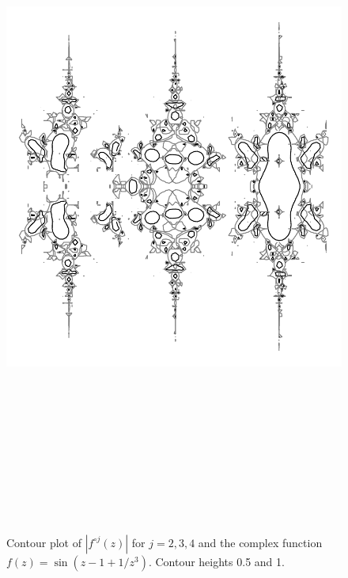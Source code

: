 \documentclass[12pt, a4paper]{amsart}
\begin{document}
\begin{figure}[!ht]
\includegraphics[width=160mm, height=230mm, angle=180]{indian_caterpillar.pdf}
\caption{
Contour plot of $|f^{\circ j}(z)|$ for $j = 2, 3, 4$ and the complex function $f(z) = \sin(z - 1 + 1/z^3)$.
Contour heights 0.5 and 1.
}
\end{figure}
\pagebreak
\end{document}
